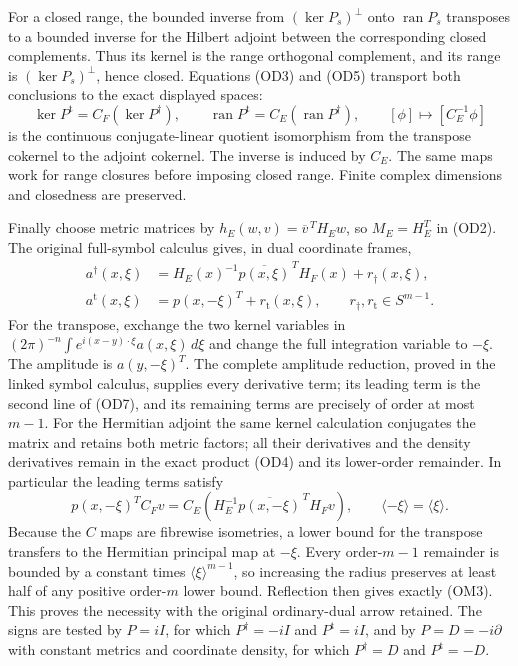 \documentclass[
  11pt,
]{article}
\begin{document}
For a closed range, the bounded inverse from \((\ker P_s)^\perp\) onto
\(\operatorname{ran}P_s\) transposes to a bounded inverse for the
Hilbert adjoint between the corresponding closed complements. Thus its
kernel is the range orthogonal complement, and its range is
\((\ker P_s)^\perp\), hence closed. Equations (OD3) and (OD5) transport
both conclusions to the exact displayed spaces: \[
 \ker P^{\mathrm t}=C_F(\ker P^\dagger),\qquad
 \operatorname{ran}P^{\mathrm t}=C_E(\operatorname{ran}P^\dagger),
 \qquad
 [\phi]\longmapsto[C_E^{-1}\phi]
 \tag{OD6}
\] is the continuous conjugate-linear quotient isomorphism from the
transpose cokernel to the adjoint cokernel. The inverse is induced by
\(C_E\). The same maps work for range closures before imposing closed
range. Finite complex dimensions and closedness are preserved.

Finally choose metric matrices by \(h_E(w,v)=\overline v^{\,T}H_Ew\), so
\(M_E=H_E^T\) in (OD2). The original full-symbol calculus gives, in dual
coordinate frames, \[
 \begin{aligned}
 a^\dagger(x,\xi)&=H_E(x)^{-1}\overline{p(x,\xi)}^{\,T}H_F(x)
                         +r_\dagger(x,\xi),\\
 a^{\mathrm t}(x,\xi)&=p(x,-\xi)^T+r_{\mathrm t}(x,\xi),
 \qquad r_\dagger,r_{\mathrm t}\in S^{m-1}.
 \end{aligned}
 \tag{OD7}
\] For the transpose, exchange the two kernel variables in
\((2\pi)^{-n}\int e^{i(x-y)\cdot\xi}a(x,\xi)\,d\xi\) and change the full
integration variable to \(-\xi\). The amplitude is \(a(y,-\xi)^T\). The
complete amplitude reduction, proved in the linked symbol calculus,
supplies every derivative term; its leading term is the second line of
(OD7), and its remaining terms are precisely of order at most \(m-1\).
For the Hermitian adjoint the same kernel calculation conjugates the
matrix and retains both metric factors; all their derivatives and the
density derivatives remain in the exact product (OD4) and its
lower-order remainder. In particular the leading terms satisfy \[
 p(x,-\xi)^T C_Fv
   =C_E\!\left(H_E^{-1}\overline{p(x,-\xi)}^{\,T}H_Fv\right),
 \qquad
 \langle-\xi\rangle=\langle\xi\rangle.
 \tag{OD8}
\] Because the \(C\) maps are fibrewise isometries, a lower bound for
the transpose transfers to the Hermitian principal map at \(-\xi\).
Every order-\(m-1\) remainder is bounded by a constant times
\(\langle\xi\rangle^{m-1}\), so increasing the radius preserves at least
half of any positive order-\(m\) lower bound. Reflection then gives
exactly (OM3). This proves the necessity with the original ordinary-dual
arrow retained. The signs are tested by \(P=iI\), for which
\(P^\dagger=-iI\) and \(P^{\mathrm t}=iI\), and by \(P=D=-i\partial\)
with constant metrics and coordinate density, for which \(P^\dagger=D\)
and \(P^{\mathrm t}=-D\).
\end{document}
